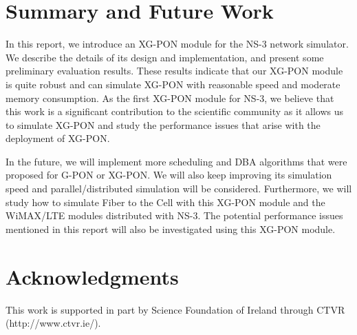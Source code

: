 \documentclass[onecolumn, draftcls]{IEEEtran}
\begin{document}
















\section{Summary and Future Work} \label{section_conclude}


In this report, we introduce an XG-PON module for the NS-3 network
simulator. We describe the details of its design and
implementation, and present some preliminary evaluation results.
These results indicate that our XG-PON module is quite robust and
can simulate XG-PON with reasonable speed and moderate memory
consumption. As the first XG-PON module for NS-3, we believe that
this work is a significant contribution to the scientific
community as it allows us to simulate XG-PON and study the
performance issues that arise with the deployment of XG-PON.

In the future, we will implement more scheduling and DBA
algorithms that were proposed for G-PON or XG-PON. We will also
keep improving its simulation speed and parallel/distributed
simulation will be considered. Furthermore, we will study how to
simulate Fiber to the Cell with this XG-PON module and the
WiMAX/LTE modules distributed with NS-3. The potential performance
issues mentioned in this report will also be investigated using
this XG-PON module.




\section{Acknowledgments}
This work is supported in part by Science Foundation
of Ireland through CTVR (http://www.ctvr.ie/).

\appendices
\newpage

\newpage

\newpage






\end{document}
